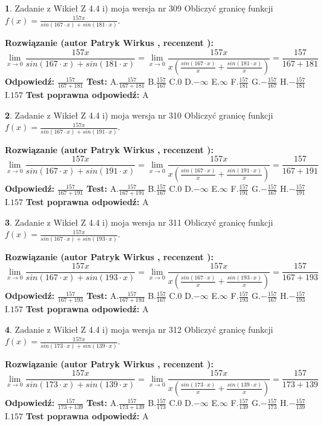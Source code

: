 \documentclass[12pt, a4paper]{article}
\theoremstyle{definition} %
\newtheorem{zad}{}
\newcommand{\zadStart}[1]{\begin{zad}#1\newline}
\newcommand{\zadStop}{\end{zad}}
\newcommand{\rozwStart}[2]{\noindent \textbf{Rozwiązanie (autor #1 , recenzent #2): }\newline}
\newcommand{\rozwStop}{\newline}
\newcommand{\odpStart}{\noindent \textbf{Odpowiedź:}\newline}
\newcommand{\odpStop}{\newline}
\newcommand{\testStart}{\noindent \textbf{Test:}\newline}
\newcommand{\testStop}{\newline}
\newcommand{\kluczStart}{\noindent \textbf{Test poprawna odpowiedź:}\newline}
\newcommand{\kluczStop}{\newline}
\begin{document}
\zadStart{Zadanie z Wikieł Z 4.4 i) moja wersja nr 309}
Obliczyć granicę funkcji $f(x)=\frac{157x}{sin(167\cdot x) +sin(181\cdot x)}$.
\zadStop
\rozwStart{Patryk Wirkus}{}
$$\lim\limits_{x\to 0}\frac{157x}{sin(167\cdot x) +sin(181\cdot x)}=\lim\limits_{x\to 0}\frac{157x}{x(\frac{sin(167\cdot x)}{x}+\frac{sin(181\cdot x)}{x})}=\frac{157}{167+181}$$
\rozwStop
\odpStart
$\frac{157}{167+181}$
\odpStop
\testStart
A.$\frac{157}{167+181}$
B.$\frac{157}{167}$
C.$0$
D.$-\infty$
E.$\infty$
F.$\frac{157}{181}$
G.$-\frac{157}{167}$
H.$-\frac{157}{181}$
I.$157$
\testStop
\kluczStart
A
\kluczStop



\zadStart{Zadanie z Wikieł Z 4.4 i) moja wersja nr 310}
Obliczyć granicę funkcji $f(x)=\frac{157x}{sin(167\cdot x) +sin(191\cdot x)}$.
\zadStop
\rozwStart{Patryk Wirkus}{}
$$\lim\limits_{x\to 0}\frac{157x}{sin(167\cdot x) +sin(191\cdot x)}=\lim\limits_{x\to 0}\frac{157x}{x(\frac{sin(167\cdot x)}{x}+\frac{sin(191\cdot x)}{x})}=\frac{157}{167+191}$$
\rozwStop
\odpStart
$\frac{157}{167+191}$
\odpStop
\testStart
A.$\frac{157}{167+191}$
B.$\frac{157}{167}$
C.$0$
D.$-\infty$
E.$\infty$
F.$\frac{157}{191}$
G.$-\frac{157}{167}$
H.$-\frac{157}{191}$
I.$157$
\testStop
\kluczStart
A
\kluczStop



\zadStart{Zadanie z Wikieł Z 4.4 i) moja wersja nr 311}
Obliczyć granicę funkcji $f(x)=\frac{157x}{sin(167\cdot x) +sin(193\cdot x)}$.
\zadStop
\rozwStart{Patryk Wirkus}{}
$$\lim\limits_{x\to 0}\frac{157x}{sin(167\cdot x) +sin(193\cdot x)}=\lim\limits_{x\to 0}\frac{157x}{x(\frac{sin(167\cdot x)}{x}+\frac{sin(193\cdot x)}{x})}=\frac{157}{167+193}$$
\rozwStop
\odpStart
$\frac{157}{167+193}$
\odpStop
\testStart
A.$\frac{157}{167+193}$
B.$\frac{157}{167}$
C.$0$
D.$-\infty$
E.$\infty$
F.$\frac{157}{193}$
G.$-\frac{157}{167}$
H.$-\frac{157}{193}$
I.$157$
\testStop
\kluczStart
A
\kluczStop



\zadStart{Zadanie z Wikieł Z 4.4 i) moja wersja nr 312}
Obliczyć granicę funkcji $f(x)=\frac{157x}{sin(173\cdot x) +sin(139\cdot x)}$.
\zadStop
\rozwStart{Patryk Wirkus}{}
$$\lim\limits_{x\to 0}\frac{157x}{sin(173\cdot x) +sin(139\cdot x)}=\lim\limits_{x\to 0}\frac{157x}{x(\frac{sin(173\cdot x)}{x}+\frac{sin(139\cdot x)}{x})}=\frac{157}{173+139}$$
\rozwStop
\odpStart
$\frac{157}{173+139}$
\odpStop
\testStart
A.$\frac{157}{173+139}$
B.$\frac{157}{173}$
C.$0$
D.$-\infty$
E.$\infty$
F.$\frac{157}{139}$
G.$-\frac{157}{173}$
H.$-\frac{157}{139}$
I.$157$
\testStop
\kluczStart
A
\kluczStop
\end{document}
